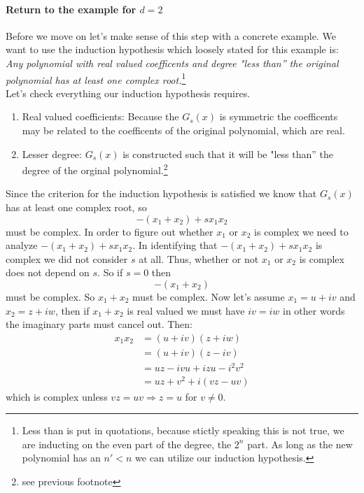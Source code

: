 \documentclass[12pt]{article}
\begin{document}
\paragraph*{Return to the example for $d=2$}
Before we move on let's make sense of this step with a concrete example.  We want to use the induction hypothesis which loosely stated for this example is: \\

\emph{Any polynomial with real valued coefficents and degree "less than'' the original polynomial has at least one complex root.}\footnote{Less than is put in quotations, because stictly speaking this is not true, we are inducting on the even part of the degree, the $2^n$ part.  As long as the new polynomial has an $n'<n$ we can utilize our induction hypothesis.}\\

Let's check everything our induction hypothesis requires.

\begin{enumerate}
\item Real valued coefficients: Because the $G_s(x)$ is symmetric the coefficents may be related to the coefficents of the original polynomial, which are real.
\item Lesser degree: $G_s(x)$ is constructed such that it will be "less than'' the degree of the orginal polynomial.\footnote{see previous footnote}
\end{enumerate}


Since the criterion for the induction hypothesis is satisfied we know that $G_s(x)$ has at least one complex root, so $$-(x_1 +x_2) + s x_1 x_2$$ must be complex.  In order to figure out whether $x_1$ or $x_2$ is complex we need to analyze $-(x_1 +x_2) + s x_1 x_2$.  In identifying that $-(x_1 +x_2) + s x_1 x_2$ is complex we did not consider $s$ at all.  Thus, whether or not $x_1$ or $x_2$ is complex does not depend on $s$.  So if $s=0$ then $$ -(x_1+x_2)$$ must be complex.  So $x_1+x_2$ must be complex.  Now let's assume $x_1 = u+iv$ and $x_2 = z+iw$, then if $x_1+x_2$ is real valued we must have $iv=iw$ in other words the imaginary parts must cancel out.  Then:
\begin{align*}
x_1 x_2 &= (u+iv)(z+iw) \\
&= (u+iv)(z-iv) \\
&= uz - ivu +izu - i^2v^2 \\
&= uz + v^2 + i(vz-uv)
\end{align*}
which is complex unless $vz=uv \Rightarrow z=u$ for $v \neq 0$. 
\end{document}
